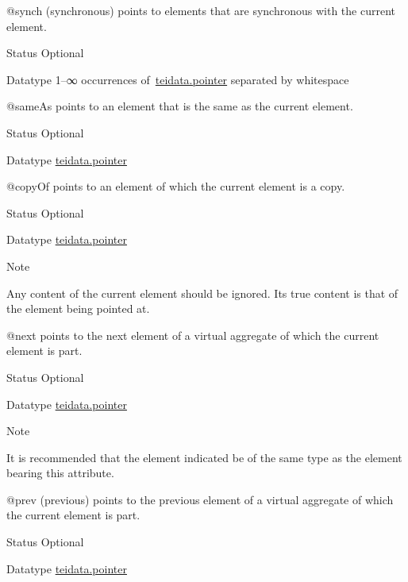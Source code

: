 \begin{reflist}
\begin{sansreflist}
\begin{reflist}
\end{reflist}  
    \item[@synch]
  (synchronous) points to elements that are synchronous with the current element.
\begin{reflist}
    \item[{Status}]
  Optional
    \item[{Datatype}]
  1–∞ occurrences of \hyperref[TEI.teidata.pointer]{teidata.pointer} separated by whitespace
\end{reflist}  
    \item[@sameAs]
  points to an element that is the same as the current element.
\begin{reflist}
    \item[{Status}]
  Optional
    \item[{Datatype}]
  \hyperref[TEI.teidata.pointer]{teidata.pointer}
\end{reflist}  
    \item[@copyOf]
  points to an element of which the current element is a copy.
\begin{reflist}
    \item[{Status}]
  Optional
    \item[{Datatype}]
  \hyperref[TEI.teidata.pointer]{teidata.pointer}
    \item[{Note}]
  \par
Any content of the current element should be ignored. Its true content is that of the element being pointed at.
\end{reflist}  
    \item[@next]
  points to the next element of a virtual aggregate of which the current element is part.
\begin{reflist}
    \item[{Status}]
  Optional
    \item[{Datatype}]
  \hyperref[TEI.teidata.pointer]{teidata.pointer}
    \item[{Note}]
  \par
It is recommended that the element indicated be of the same type as the element bearing this attribute.
\end{reflist}  
    \item[@prev]
  (previous) points to the previous element of a virtual aggregate of which the current element is part.
\begin{reflist}
    \item[{Status}]
  Optional
    \item[{Datatype}]
  \hyperref[TEI.teidata.pointer]{teidata.pointer}

\end{reflist}
\end{sansreflist}
\end{reflist}

